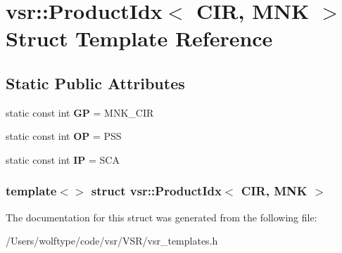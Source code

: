 \hypertarget{structvsr_1_1_product_idx_3_01_c_i_r_00_01_m_n_k_01_4}{\section{vsr\-:\-:Product\-Idx$<$ C\-I\-R, M\-N\-K $>$ Struct Template Reference}
\label{structvsr_1_1_product_idx_3_01_c_i_r_00_01_m_n_k_01_4}
}
\subsection*{Static Public Attributes}
\begin{DoxyCompactItemize}
\item 
\hypertarget{structvsr_1_1_product_idx_3_01_c_i_r_00_01_m_n_k_01_4_a7191c4b73d182308d1b03007416f1fde}{static const int {\bfseries G\-P} = M\-N\-K\-\_\-\-C\-I\-R}\label{structvsr_1_1_product_idx_3_01_c_i_r_00_01_m_n_k_01_4_a7191c4b73d182308d1b03007416f1fde}

\item 
\hypertarget{structvsr_1_1_product_idx_3_01_c_i_r_00_01_m_n_k_01_4_aafda45d55a830780b97eef1eaef65daf}{static const int {\bfseries O\-P} = P\-S\-S}\label{structvsr_1_1_product_idx_3_01_c_i_r_00_01_m_n_k_01_4_aafda45d55a830780b97eef1eaef65daf}

\item 
\hypertarget{structvsr_1_1_product_idx_3_01_c_i_r_00_01_m_n_k_01_4_a2882512b826c89ba87cf4efe3a0a30f7}{static const int {\bfseries I\-P} = S\-C\-A}\label{structvsr_1_1_product_idx_3_01_c_i_r_00_01_m_n_k_01_4_a2882512b826c89ba87cf4efe3a0a30f7}

\end{DoxyCompactItemize}
\subsubsection*{template$<$$>$ struct vsr\-::\-Product\-Idx$<$ C\-I\-R, M\-N\-K $>$}



The documentation for this struct was generated from the following file\-:\begin{DoxyCompactItemize}
\item 
/\-Users/wolftype/code/vsr/\-V\-S\-R/vsr\-\_\-templates.\-h\end{DoxyCompactItemize}
